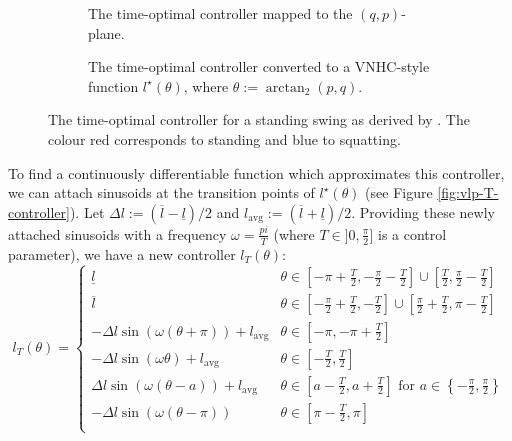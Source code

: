 \begin{figure}
   \centering
   \begin{subfigure}[t]{0.45\textwidth}
      
      \caption{The time-optimal controller mapped to the \((q,p)\)-plane.}
      \label{fig:vlp-optimal-controller-qp-plane}
   \end{subfigure}
   \hfill
   \begin{subfigure}[t]{0.45\textwidth}
      
      \caption{The time-optimal controller converted to a VNHC-style 
      function \(l^\star(\theta)\), where \(\theta := \arctan_2(p,q)\).}\label{fig:vlp-optimal-controller}
   \end{subfigure}
   \caption{The time-optimal controller for a standing swing as derived by
      \cite{pumping_swing_standing_squatting}. The colour red
      corresponds to standing and blue to squatting.}
\end{figure}

To find a continuously differentiable function which approximates this controller,
we can attach sinusoids at the transition points of
\(l^\star(\theta)\) (see Figure \ref{fig:vlp-T-controller}). Let
\(\Delta l := (\overline{l} - \underline{l})/2\) and 
\(l_{\text{avg}} := (\overline{l} + \underline{l})/2\).
Providing these newly attached sinusoids with a frequency \(\omega = \frac{pi}{T}\) 
(where \(T \in ]0,\frac{\pi}{2}]\) is a control parameter), we have a new
controller \(l_T(\theta)\):
\begin{equation}\label{eqn:vlp-T-controller}
   l_T(\theta) = \begin{cases}
      \underline{l} & \theta \in \left[-\pi + \frac{T}{2}, -\frac{\pi}{2} - \frac{T}{2}\right] 
      \cup \left[\frac{T}{2}, \frac{\pi}{2} - \frac{T}{2}\right] \\
      \overline{l} & \theta \in \left[-\frac{\pi}{2} + \frac{T}{2}, -\frac{T}{2}\right] 
      \cup \left[\frac{\pi}{2} + \frac{T}{2}, \pi - \frac{T}{2}\right] \\
      -\Delta l \sin(\omega(\theta + \pi)) + l_{\text{avg}} & \theta \in
      \left[-\pi,-\pi + \frac{T}{2}\right] \\
      -\Delta l \sin(\omega \theta) + l_\text{avg} & \theta \in [-\frac{T}{2},
      \frac{T}{2}] \\
      \Delta l \sin(\omega(\theta - a)) + l_\text{avg} & 
      \theta \in \left[a - \frac{T}{2}, a + \frac{T}{2}\right] \text{ for } 
      a \in \left\{-\frac{\pi}{2}, \frac{\pi}{2}\right\} \\
      -\Delta l \sin(\omega(\theta-\pi)) & \theta \in \left[\pi - \frac{T}{2},\pi\right] \\
   \end{cases}
\end{equation}

